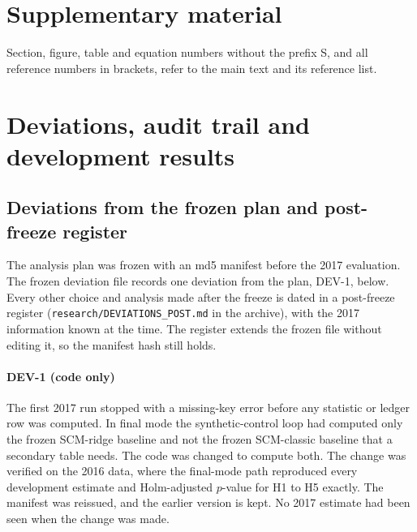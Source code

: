 
\setcounter{section}{0}
\renewcommand{\thesection}{S\arabic{section}}
\setcounter{table}{0}
\renewcommand{\thetable}{S\arabic{table}}
\setcounter{figure}{0}
\renewcommand{\thefigure}{S\arabic{figure}}

\section*{Supplementary material}

Section, figure, table and equation numbers without the prefix S, and all reference numbers in brackets, refer to the main text and its reference list.

\section{Deviations, audit trail and development results}\label{sec:S1}

\subsection{Deviations from the frozen plan and post-freeze register}\label{sec:S1:dev}

The analysis plan was frozen with an md5 manifest before the 2017 evaluation. The frozen deviation file records one deviation from the plan, DEV-1, below. Every other choice and analysis made after the freeze is dated in a post-freeze register (\texttt{research/DEVIATIONS\_POST.md} in the archive), with the 2017 information known at the time. The register extends the frozen file without editing it, so the manifest hash still holds.

\paragraph{DEV-1 (code only)} The first 2017 run stopped with a missing-key error before any statistic or ledger row was computed. In final mode the synthetic-control loop had computed only the frozen SCM-ridge baseline and not the frozen SCM-classic baseline that a secondary table needs. The code was changed to compute both. The change was verified on the 2016 data, where the final-mode path reproduced every development estimate and Holm-adjusted $p$-value for H1 to H5 exactly. The manifest was reissued, and the earlier version is kept. No 2017 estimate had been seen when the change was made.

